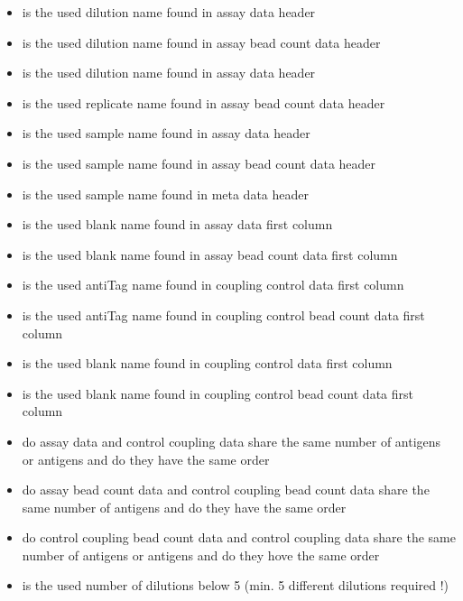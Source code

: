 \documentclass[]{book}
\providecommand{\tightlist}{%
  \setlength{\itemsep}{0pt}\setlength{\parskip}{0pt}}
\theoremstyle{definition}
\theoremstyle{definition}
\theoremstyle{definition}
\theoremstyle{remark}
\begin{document}
\begin{itemize}
\tightlist
\item
  is the used dilution name found in assay data header
\item
  is the used dilution name found in assay bead count data header
\item
  is the used dilution name found in assay data header
\item
  is the used replicate name found in assay bead count data header
\item
  is the used sample name found in assay data header
\item
  is the used sample name found in assay bead count data header
\item
  is the used sample name found in meta data header
\item
  is the used blank name found in assay data first column
\item
  is the used blank name found in assay bead count data first column
\item
  is the used antiTag name found in coupling control data first column
\item
  is the used antiTag name found in coupling control bead count data
  first column
\item
  is the used blank name found in coupling control data first column
\item
  is the used blank name found in coupling control bead count data first
  column
\item
  do assay data and control coupling data share the same number of
  antigens or antigens and do they have the same order
\item
  do assay bead count data and control coupling bead count data share
  the same number of antigens and do they have the same order
\item
  do control coupling bead count data and control coupling data share
  the same number of antigens or antigens and do they hove the same
  order
\item
  is the used number of dilutions below 5 (min. 5 different dilutions
  required !)
\end{itemize}
\end{document}
